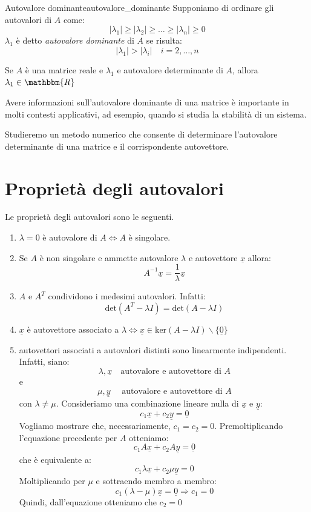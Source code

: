 \documentclass[12pt]{report}
\newcounter{definition}
\newcommand{\nmu}{}
\begin{document}
\begin{definition}{\nmu Autovalore dominante}{autovalore_dominante}
Supponiamo di ordinare gli autovalori di $A$ come:
\[
\left|\lambda_1\right| \geq \left|\lambda_2\right| \geq \dots \geq \left|\lambda_n\right| \geq 0
\]
$\lambda_1$ è detto \textit{autovalore dominante} di $A$ se risulta:
\[
\left|\lambda_1\right| > \left|\lambda_i\right| \quad i=2,\dots, n
\]
\end{definition}
\begin{note}{}{}
Se $A$ è una matrice reale e $\lambda_1$ e autovalore determinante di $A$, allora $\lambda_1 \in \mathbbm{R}$
\end{note}
Avere informazioni sull'autovalore dominante di una matrice è importante in molti contesti applicativi, ad esempio, quando si studia la stabilità di un sistema.

Studieremo un metodo numerico che consente di determinare l'autovalore determinante di una matrice e il corrispondente autovettore.
\section{Proprietà degli autovalori}
Le proprietà degli autovalori sono le seguenti.
\begin{enumerate}
	\item $\lambda = 0$ è autovalore di $A \iff A$ è singolare.
	\item Se $A$ è non singolare e ammette autovalore $\lambda$ e autovettore $\underline{x}$ allora:
	\[
	A^{-1}\underline{x} = \frac{1}{\lambda}\underline{x}
	\]
	\item $A$ e $A^T$ condividono i medesimi autovalori. Infatti:
	\[
	\text{det}(A^T - \lambda I) = \text{det}(A - \lambda I)
	\]
	\item $\underline{x}$ è autovettore associato a $\lambda \iff \underline{x} \in \text{ker}(A -\lambda I) \backslash \{\underline{0}\}$
	\item autovettori associati a autovalori distinti sono linearmente indipendenti. Infatti, siano:
	\[
	\lambda, \underline{x} \quad \text{autovalore e autovettore di }A
	\]
	e
	\[
	\mu, \underline{y} \quad \text{ autovalore e autovettore di }A
	\]
	con $\lambda \neq \mu$. Consideriamo una combinazione lineare nulla di $\underline{x}$ e $\underline{y}$:
	\[
	c_1\underline{x} + c_2\underline{y} = \underline{0}
	\]
	Vogliamo mostrare che, necessariamente, $c_1 = c_2 = 0$. Premoltiplicando l'equazione precedente per $A$ otteniamo:
	\[
	c_1A\underline{x} + c_2A\underline{y} = \underline{0}
	\]
	che è equivalente a:
	\[
	c_1\lambda\underline{x} + c_2\mu\underline{y} = 0
	\]
	Moltiplicando per $\mu$ e sottraendo membro a membro:
	\[
	c_1(\lambda-\mu)\underline{x} = \underline{0} \Rightarrow c_1 = 0
	\]
	Quindi, dall'equazione otteniamo che $c_2 = 0$
\end{enumerate}
\end{document}
